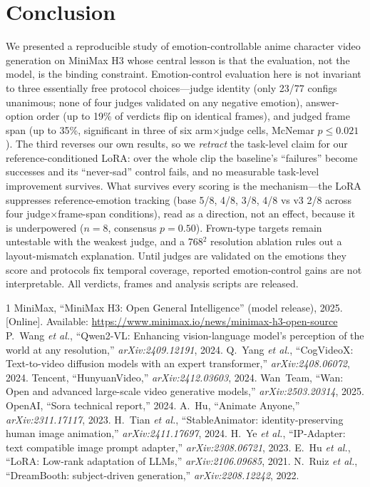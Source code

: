 \documentclass[conference]{IEEEtran}
\begin{document}
\section{Conclusion}
We presented a reproducible study of emotion-controllable anime character video generation on MiniMax
H3 whose central lesson is that the evaluation, not the model, is the binding constraint.
Emotion-control evaluation here is not invariant to three essentially free protocol
choices---judge identity (only 23/77 configs unanimous; none of four judges validated on any negative
emotion), answer-option order (up to 19\% of verdicts flip on identical frames), and judged frame span
(up to 35\%, significant in three of six arm$\times$judge cells, McNemar $p{\le}0.021$). The third reverses our own results,
so we \emph{retract} the task-level claim for our reference-conditioned LoRA: over the whole clip the
baseline's ``failures'' become successes and its ``never-sad'' control fails, and no measurable
task-level improvement survives. What survives every scoring is the mechanism---the LoRA suppresses
reference-emotion tracking (base 5/8, 4/8, 3/8, 4/8 vs v3 2/8 across four judge$\times$frame-span
conditions), read as a direction, not an effect, because it is underpowered ($n{=}8$, consensus
$p{=}0.50$).
Frown-type targets remain untestable with the weakest judge, and a 768$^2$ resolution ablation rules
out a layout-mismatch explanation. Until judges are validated on the emotions they score and protocols
fix temporal coverage, reported emotion-control gains are not interpretable. All verdicts, frames and
analysis scripts are released.

\footnotesize
\begin{thebibliography}{1}
 MiniMax, ``MiniMax H3: Open General Intelligence'' (model release), 2025. [Online].
Available: \url{https://www.minimax.io/news/minimax-h3-open-source}
 P.~Wang \emph{et al.}, ``Qwen2-VL: Enhancing vision-language model's perception of the world at any resolution,'' \emph{arXiv:2409.12191}, 2024.
 Q.~Yang \emph{et al.}, ``CogVideoX: Text-to-video diffusion models with an expert transformer,'' \emph{arXiv:2408.06072}, 2024.
 Tencent, ``HunyuanVideo,'' \emph{arXiv:2412.03603}, 2024.
 Wan~Team, ``Wan: Open and advanced large-scale video generative models,'' \emph{arXiv:2503.20314}, 2025.
 OpenAI, ``Sora technical report,'' 2024.
 A.~Hu, ``Animate Anyone,'' \emph{arXiv:2311.17117}, 2023.
 H.~Tian \emph{et al.}, ``StableAnimator: identity-preserving human image animation,'' \emph{arXiv:2411.17697}, 2024.
 H.~Ye \emph{et al.}, ``IP-Adapter: text compatible image prompt adapter,'' \emph{arXiv:2308.06721}, 2023.
 E.~Hu \emph{et al.}, ``LoRA: Low-rank adaptation of LLMs,'' \emph{arXiv:2106.09685}, 2021.
 N.~Ruiz \emph{et al.}, ``DreamBooth: subject-driven generation,'' \emph{arXiv:2208.12242}, 2022.
\end{thebibliography}
\end{document}
